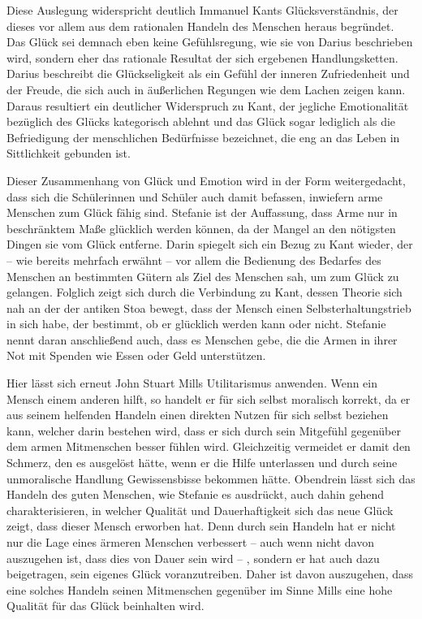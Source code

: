 Diese Auslegung widerspricht deutlich Immanuel Kants Glücksverständnis, der dieses vor allem aus dem rationalen Handeln des Menschen heraus begründet. 
Das Glück sei demnach eben keine Gefühlsregung, wie sie von Darius beschrieben wird, sondern eher das rationale Resultat der sich ergebenen Handlungsketten. 
Darius beschreibt die Glückseligkeit als ein Gefühl der inneren Zufriedenheit und der Freude, die sich auch in äußerlichen Regungen wie dem Lachen zeigen kann. 
Daraus resultiert ein deutlicher Widerspruch zu Kant, der jegliche Emotionalität bezüglich des Glücks kategorisch ablehnt und das Glück sogar lediglich als die Befriedigung der menschlichen Bedürfnisse bezeichnet, die eng an das Leben in Sittlichkeit gebunden ist. 

Dieser Zusammenhang von Glück und Emotion wird  in der Form weitergedacht, dass sich die Schülerinnen und Schüler auch damit befassen, inwiefern arme Menschen zum Glück fähig sind. 
Stefanie ist der Auffassung, dass Arme nur in beschränktem Maße glücklich werden können, da der Mangel an den nötigsten Dingen sie vom Glück entferne. 
Darin spiegelt sich ein Bezug zu Kant wieder, der -- wie bereits mehrfach erwähnt -- vor allem die Bedienung des Bedarfes des Menschen an bestimmten Gütern als Ziel des Menschen sah, um zum Glück zu gelangen. 
Folglich zeigt sich durch die Verbindung zu Kant, dessen Theorie sich nah an der der antiken Stoa bewegt, dass der Mensch einen Selbsterhaltungstrieb in sich habe, der bestimmt, ob er glücklich werden kann oder nicht. 
Stefanie nennt daran anschließend auch, dass es Menschen gebe, die die Armen in ihrer Not mit Spenden wie Essen oder Geld unterstützen. 

Hier lässt sich erneut John Stuart Mills Utilitarismus anwenden. 
Wenn ein Mensch einem anderen hilft, so handelt er für sich selbst moralisch korrekt, da er aus seinem helfenden Handeln einen direkten Nutzen für sich selbst beziehen kann, welcher darin bestehen wird, dass er sich durch sein Mitgefühl gegenüber dem armen Mitmenschen besser fühlen wird. 
Gleichzeitig vermeidet er damit den Schmerz, den es ausgelöst hätte, wenn er die Hilfe unterlassen und durch seine unmoralische Handlung Gewissensbisse bekommen hätte. 
Obendrein lässt sich das Handeln des guten Menschen, wie Stefanie es ausdrückt, auch dahin gehend charakterisieren, in welcher Qualität und Dauerhaftigkeit sich das neue Glück zeigt, dass dieser Mensch erworben hat. 
Denn durch sein Handeln hat er nicht nur die Lage eines ärmeren Menschen verbessert -- auch wenn nicht davon auszugehen ist, dass dies von Dauer sein wird -- , sondern er hat auch dazu beigetragen, sein eigenes Glück voranzutreiben. 
Daher ist davon auszugehen, dass eine solches Handeln seinen Mitmenschen gegenüber im Sinne Mills eine hohe Qualität für das Glück beinhalten wird.

